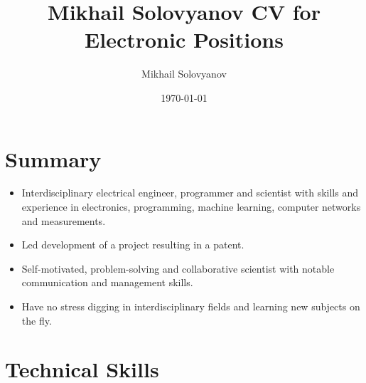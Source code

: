 \documentclass{article}
\title{ Mikhail Solovyanov CV for Electronic Positions}
\author{Mikhail Solovyanov}
\date{\today}
\begin{document}
 
 
\makecvtitle %
 
\section{Summary}
\begin{itemize}
\item Interdisciplinary electrical engineer, programmer and scientist with skills and experience in electronics, programming, machine learning, computer networks and measurements.
\item Led development of a  project resulting in a patent.
\item Self-motivated, problem-solving and collaborative scientist with notable communication and management skills.
\item Have no stress digging in interdisciplinary fields and learning new subjects on the fly.
\end{itemize}
 
\section{Technical Skills}
 
\end{document}

